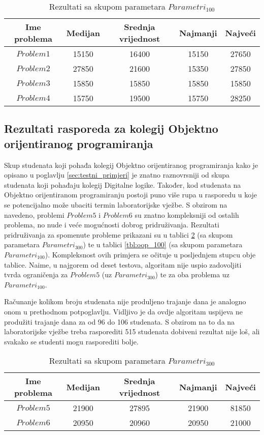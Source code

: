 \documentclass[times, utf8, zavrsni]{fer}
\begin{document}
\begin{table}
  \caption{Rezultati sa skupom parametara $Parametri_{100}$}
  \label{tbl:diglog_100}
  \centering
  \begin{tabular}{c | c | c | c | c   }
    Ime problema &  Medijan & Srednja vrijednost & Najmanji & Najveći \\ \hline
    $Problem1$ &  15150 & 16400 & 15150 & 27650 \\ \hline
    $Problem2$ &  27850 & 21600 & 15350 & 27850 \\ \hline
    $Problem3$ &  15850 & 15850 & 15850 & 15850 \\ \hline
    $Problem4$ &  15750 & 19500 & 15750 & 28250
  \end{tabular}
\end{table}


\subsection{Rezultati rasporeda za kolegij Objektno orijentiranog programiranja}
Skup studenata koji pohađa kolegij Objektno orijentiranog programiranja kako je opisano u poglavlju \ref{sec:testni_primjeri} je znatno raznovrsniji od skupa studenata
koji pohađaju kolegij Digitalne logike. Također, kod studenata na Objektno orijentiranom programiranju postoji puno više rupa u rasporedu u koje se potencijalno može
ubaciti termin laboratorijske vježbe. S obzirom na navedeno, problemi $Problem5$ i $Problem6$ su znatno kompleksniji od ostalih problema, no nude i veće mogućnosti
dobrog pridruživanja. Rezultati pridruživanja za spomenute probleme prikazani su u tablici \ref{tbl:oop_300} (sa skupom parametara $Parametri_{300}$) te u tablici
\ref{tbl:oop_100} (sa skupom parametara $Parametri_{100}$). Kompleksnost ovih primjera se očituje u posljednjem stupcu obje tablice. Naime, u najgorem od deset testova,
algoritam nije uspio zadovoljiti tvrda ograničenja za $Problem5$ (uz $Parametri_{300}$) te za oba problema uz $Parametri_{100}$.

Računanje kolikom broju studenata nije produljeno trajanje dana je analogno onom u prethodnom potpoglavlju. Vidljivo je da ovdje algoritam uspijeva ne produžiti trajanje dana
za od 96 do 106 studenata. S obzirom na to da na laboratorijske vježbe treba rasporediti 515 studenata dobiveni rezultat nije loš, ali svakako se studenti mogu rasporediti bolje.

\begin{table}
  \caption{Rezultati sa skupom parametara $Parametri_{300}$}
  \label{tbl:oop_300}
  \centering
  \begin{tabular}{c | c | c | c | c }
    Ime problema &  Medijan & Srednja vrijednost & Najmanji & Najveći \\ \hline
    $Problem5$ & 21900 & 27895 & 21900 & 81850 \\ \hline
    $Problem6$ & 20950 & 20960 & 20950 & 21000
  \end{tabular}
\end{table}
\end{document}
